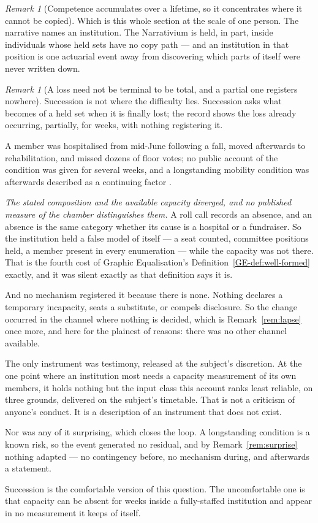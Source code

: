 \documentclass[11pt,a4paper]{article}
\theoremstyle{remark}
\newtheorem{remark}[definition]{Remark}
\begin{document}
\begin{remark}[Competence accumulates over a lifetime, so it concentrates where it cannot be copied]
Which is this whole section at the scale of one person. The narrative names an institution. The
Narrativium is held, in part, inside individuals whose held sets have no copy path --- and an institution
in that position is one actuarial event away from discovering which parts of itself were never written
down.
\end{remark}

\begin{remark}[A loss need not be terminal to be total, and a partial one registers nowhere]\label{rem:vacancy}
Succession is not where the difficulty lies. Succession asks what becomes of a held set when it
is finally lost; the record shows the loss already occurring, partially, for weeks, with nothing
registering it.

A member was hospitalised from mid-June following a fall, moved afterwards to rehabilitation, and
missed dozens of floor votes; no public account of the condition was given for several weeks, and
a longstanding mobility condition was afterwards described as a continuing factor \citep{hospital2026}.

\emph{The stated composition and the available capacity diverged, and no published measure of the
chamber distinguishes them.} A roll call records an absence, and an absence is the same category whether
its cause is a hospital or a fundraiser. So the institution held a false model of itself --- a
seat counted, committee positions held, a member present in every enumeration --- while the capacity was
not there. That is the fourth cost of Graphic Equalisation's Definition~\ref{GE-def:well-formed} exactly, and it was silent exactly as that
definition says it is.

And no mechanism registered it because there is none. Nothing declares a temporary incapacity,
seats a substitute, or compels disclosure. So the change occurred in the channel where nothing is
decided, which is Remark~\ref{rem:lapse} once more, and here for the plainest of reasons: there was no
other channel available.

The only instrument was testimony, released at the subject's discretion. At the one point
where an institution most needs a capacity measurement of its own members, it holds nothing but the
input class this account ranks least reliable, on three grounds, delivered on the subject's timetable.
That is not a criticism of anyone's conduct. It is a description of an instrument that does not exist.

Nor was any of it surprising, which closes the loop. A longstanding condition is a known risk, so
the event generated no residual, and by Remark~\ref{rem:surprise} nothing adapted --- no contingency
before, no mechanism during, and afterwards a statement.

Succession is the comfortable version of this question. The uncomfortable one is that capacity
can be absent for weeks inside a fully-staffed institution and appear in no measurement it keeps of
itself.
\end{remark}
\end{document}
